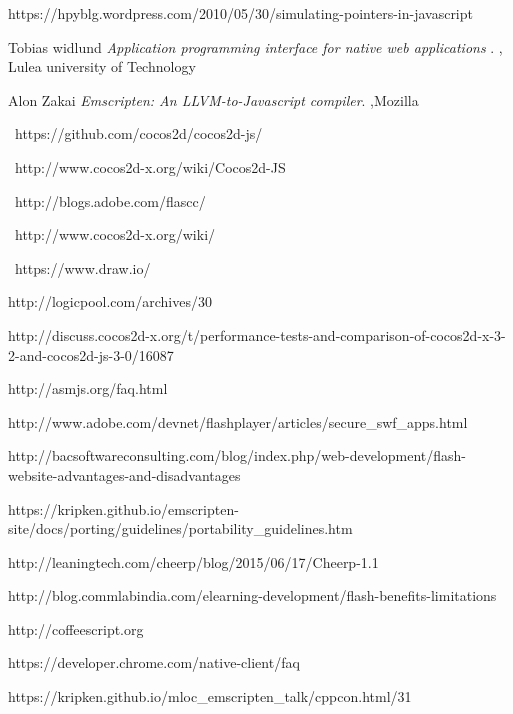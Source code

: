 \documentclass[23pt]{article}
\begin{document}
\begin{thebibliography}{9}
{https://hpyblg.wordpress.com/2010/05/30/simulating-pointers-in-javascript}

 
Tobias widlund
\textit{Application programming interface for native web applications }. 
, Lulea university of Technology
 
Alon Zakai 
\textit{Emscripten: An LLVM-to-Javascript compiler}. 
 ,Mozilla

\  https://github.com/cocos2d/cocos2d-js/

\ http://www.cocos2d-x.org/wiki/Cocos2d-JS

\  http://blogs.adobe.com/flascc/

\  http://www.cocos2d-x.org/wiki/

\ https://www.draw.io/

{http://logicpool.com/archives/30}

{http://discuss.cocos2d-x.org/t/performance-tests-and-comparison-of-cocos2d-x-3-2-and-cocos2d-js-3-0/16087}

{http://asmjs.org/faq.html}

{http://www.adobe.com/devnet/flashplayer/articles/secure\_swf\_apps.html}

{http://bacsoftwareconsulting.com/blog/index.php/web-development/flash-website-advantages-and-disadvantages}

{https://kripken.github.io/emscripten-site/docs/porting/guidelines/portability\_guidelines.htm}

{http://leaningtech.com/cheerp/blog/2015/06/17/Cheerp-1.1}

{http://blog.commlabindia.com/elearning-development/flash-benefits-limitations}

{http://coffeescript.org}

{https://developer.chrome.com/native-client/faq}

{https://kripken.github.io/mloc\_emscripten\_talk/cppcon.html/31}

\end{thebibliography}
\end{document}
